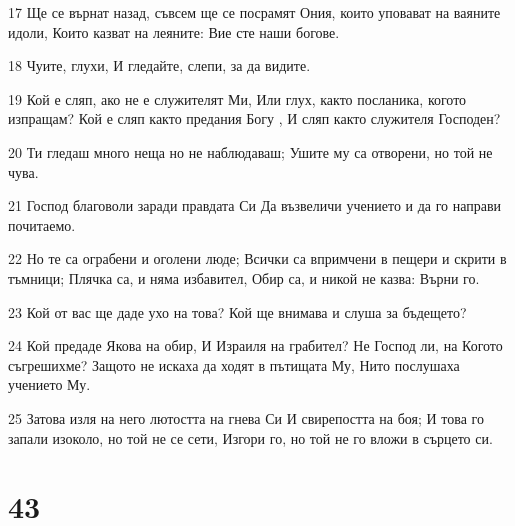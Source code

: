 \par 17 Ще се върнат назад, съвсем ще се посрамят Ония, които уповават на ваяните идоли, Които казват на леяните: Вие сте наши богове.
\par 18 Чуите, глухи, И гледайте, слепи, за да видите.
\par 19 Кой е сляп, ако не е служителят Ми, Или глух, както посланика, когото изпращам? Кой е сляп както предания Богу , И сляп както служителя Господен?
\par 20 Ти гледаш много неща но не наблюдаваш; Ушите му са отворени, но той не чува.
\par 21 Господ благоволи заради правдата Си Да възвеличи учението и да го направи почитаемо.
\par 22 Но те са ограбени и оголени люде; Всички са впримчени в пещери и скрити в тъмници; Плячка са, и няма избавител, Обир са, и никой не казва: Върни го.
\par 23 Кой от вас ще даде ухо на това? Кой ще внимава и слуша за бъдещето?
\par 24 Кой предаде Якова на обир, И Израиля на грабител? Не Господ ли, на Когото съгрешихме? Защото не искаха да ходят в пътищата Му, Нито послушаха учението Му.
\par 25 Затова изля на него лютостта на гнева Си И свирепостта на боя; И това го запали изоколо, но той не се сети, Изгори го, но той не го вложи в сърцето си.

\chapter{43}

